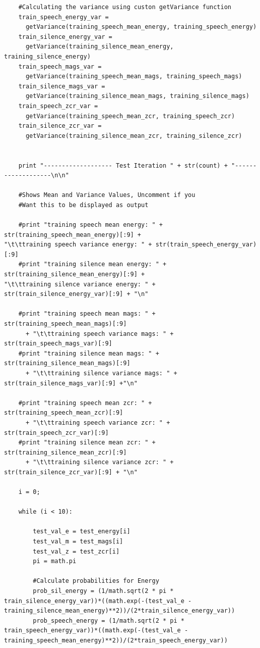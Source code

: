 \documentclass[12pt]{article} %
\begin{document}
\begin{verbatim}
	#Calculating the variance using custon getVariance function
	train_speech_energy_var = 
	  getVariance(training_speech_mean_energy, training_speech_energy)
	train_silence_energy_var = 
	  getVariance(training_silence_mean_energy,
training_silence_energy)
	train_speech_mags_var = 
	  getVariance(training_speech_mean_mags, training_speech_mags)
	train_silence_mags_var = 
	  getVariance(training_silence_mean_mags, training_silence_mags)
	train_speech_zcr_var = 
	  getVariance(training_speech_mean_zcr, training_speech_zcr)
	train_silence_zcr_var = 
	  getVariance(training_silence_mean_zcr, training_silence_zcr)

	
	print "------------------- Test Iteration " + str(count) + "-------------------\n\n"

	#Shows Mean and Variance Values, Uncomment if you
	#Want this to be displayed as output

	#print "training speech mean energy: " + str(training_speech_mean_energy)[:9] +
"\t\ttraining speech variance energy: " + str(train_speech_energy_var)[:9]
	#print "training silence mean energy: " + str(training_silence_mean_energy)[:9] +
"\t\ttraining silence variance energy: " + str(train_silence_energy_var)[:9] + "\n"

	#print "training speech mean mags: " + str(training_speech_mean_mags)[:9] 
	  + "\t\ttraining speech variance mags: " + str(train_speech_mags_var)[:9]
	#print "training silence mean mags: " + str(training_silence_mean_mags)[:9] 
	  + "\t\ttraining silence variance mags: " + str(train_silence_mags_var)[:9] +"\n"

	#print "training speech mean zcr: " + str(training_speech_mean_zcr)[:9] 
	  + "\t\ttraining speech variance zcr: " + str(train_speech_zcr_var)[:9]
	#print "training silence mean zcr: " + str(training_silence_mean_zcr)[:9] 
	  + "\t\ttraining silence variance zcr: " + str(train_silence_zcr_var)[:9] + "\n"
	
	i = 0;
	
	while (i < 10):

		test_val_e = test_energy[i]
		test_val_m = test_mags[i]
		test_val_z = test_zcr[i]
		pi = math.pi

		#Calculate probabilities for Energy
		prob_sil_energy = (1/math.sqrt(2 * pi *
train_silence_energy_var))*((math.exp(-(test_val_e -
training_silence_mean_energy)**2))/(2*train_silence_energy_var))
		prob_speech_energy = (1/math.sqrt(2 * pi *
train_speech_energy_var))*((math.exp(-(test_val_e -
training_speech_mean_energy)**2))/(2*train_speech_energy_var))
		

\end{verbatim}
\end{document}
